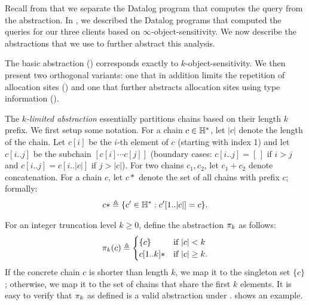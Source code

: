 
Recall from  that we separate the Datalog program that
computes the query from the abstraction.  In , we described
the Datalog programs that computed the queries for our three clients based on
$\infty$-object-sensitivity.  We now describe the abstractions that we use to
further abstract this analysis.

The basic abstraction () corresponds exactly to
$k$-object-sensitivity.  We then present two orthogonal variants: one that in
addition limits the repetition of allocation sites ()
and one that further abstracts allocation sites using type information
().


The {\em $k$-limited abstraction}
essentially partitions chains based on their length $k$ prefix.
We first setup some notation.
For a chain $c \in {\mathbb H}^*$, let $|c|$ denote the length of the chain.
Let $c[i]$ be the $i$-th element of $c$ (starting with index 1) and
let $c[i..j]$ be the subchain $[c[i] \cdots c[j]]$
(boundary cases: $c[i..j] = [\,]$ if $i > j$ and $c[i..j] = c[i..|c|]$ if $j > |c|$).
For two chains $c_1, c_2$, let $c_1+c_2$ denote concatenation.
For a chain $c$, let $c*$ denote the set of all chains
with prefix $c$; formally:
\begin{align}
c* \triangleq \{ c' \in {\mathbb H}^* : c'[1..|c|] = c \}.
\end{align}

For an integer truncation level $k \ge 0$, define the abstraction $\pi_k$ as follows:
\begin{align}
\label{eqn:klimitedAbstraction}
\pi_k(c) \triangleq
\begin{cases}
\{c\}     & \text{if $|c| < k$} \\
c[1..k]*  & \text{if $|c| \ge k$}. \\
\end{cases}
\end{align}
If the concrete chain $c$ is shorter than length $k$,
we map it to the singleton set $\{ c \}$;
otherwise, we map it to the set of chains that share the first $k$ elements.
It is easy to verify that $\pi_k$ as defined is a valid abstraction under .
 shows an example.

